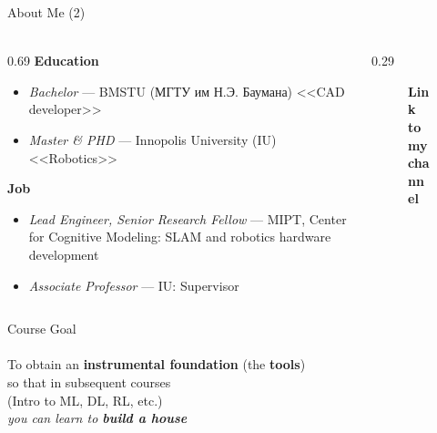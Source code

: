 \documentclass[aspectratio=169]{beamer}
\begin{document}
\begin{frame}[t]{About Me (2)}
    \framesubtitle{}
    \begin{columns}[T,onlytextwidth]
        \begin{column}{0.69\textwidth}
            \textbf{Education}
            \begin{itemize}
                \item \textit{Bachelor} --- BMSTU (МГТУ им Н.Э. Баумана) <<CAD developer>>
                \item \textit{Master \& PHD} --- Innopolis University (IU) <<Robotics>>
            \end{itemize}
            \textbf{Job}
            \begin{itemize}
                \item \textit{Lead Engineer, Senior Research Fellow} --- MIPT, Center for Cognitive Modeling: SLAM and robotics hardware development
                \item \textit{Associate Professor} --- IU: Supervisor
            \end{itemize}
        \end{column}
        \begin{column}{0.29\textwidth}
            \begin{figure}[H]
                \centering
                \caption*{\textbf{Link to my channel}}
                \label{fig:qrcode}
            \end{figure}
        \end{column}
    \end{columns}
\end{frame}

\begin{frame}[c]{Course Goal}
    \framesubtitle{}
    \centering \Large
    To obtain an \textbf{instrumental foundation} (the \textbf{tools}) \\
    so that in subsequent courses \\
    (Intro to ML, DL, RL, etc.) \\
    \medskip
    \textit{you can learn to \textbf{build a house}}
\end{frame}
\end{document}
